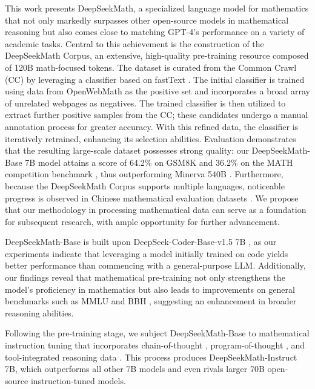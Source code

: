 This work presents DeepSeekMath, a specialized language model for mathematics that not only markedly surpasses other open-source models in mathematical reasoning but also comes close to matching GPT-4’s performance on a variety of academic tasks. Central to this achievement is the construction of the DeepSeekMath Corpus, an extensive, high-quality pre-training resource composed of 120B math-focused tokens. The dataset is curated from the Common Crawl (CC) by leveraging a classifier based on fastText \citep{joulin2016fasttext}. The initial classifier is trained using data from OpenWebMath \citep{openwebmath} as the positive set and incorporates a broad array of unrelated webpages as negatives. The trained classifier is then utilized to extract further positive samples from the CC; these candidates undergo a manual annotation process for greater accuracy. With this refined data, the classifier is iteratively retrained, enhancing its selection abilities. Evaluation demonstrates that the resulting large-scale dataset possesses strong quality: our DeepSeekMath-Base 7B model attains a score of 64.2\% on GSM8K \citep{gsm8k} and 36.2\% on the MATH competition benchmark \citep{MATH}, thus outperforming Minerva 540B \citep{minerva}. Furthermore, because the DeepSeekMath Corpus supports multiple languages, noticeable progress is observed in Chinese mathematical evaluation datasets \citep{wei2023cmath,agieval}. We propose that our methodology in processing mathematical data can serve as a foundation for subsequent research, with ample opportunity for further advancement.

DeepSeekMath-Base is built upon DeepSeek-Coder-Base-v1.5 7B \citep{deepseek-coder}, as our experiments indicate that leveraging a model initially trained on code yields better performance than commencing with a general-purpose LLM. Additionally, our findings reveal that mathematical pre-training not only strengthens the model’s proficiency in mathematics but also leads to improvements on general benchmarks such as MMLU \citep{mmlu} and BBH \citep{bbh}, suggesting an enhancement in broader reasoning abilities.

Following the pre-training stage, we subject DeepSeekMath-Base to mathematical instruction tuning that incorporates chain-of-thought \citep{cot}, program-of-thought \citep{pot,pal}, and tool-integrated reasoning data \citep{tora}. This process produces DeepSeekMath-Instruct 7B, which outperforms all other 7B models and even rivals larger 70B open-source instruction-tuned models.

